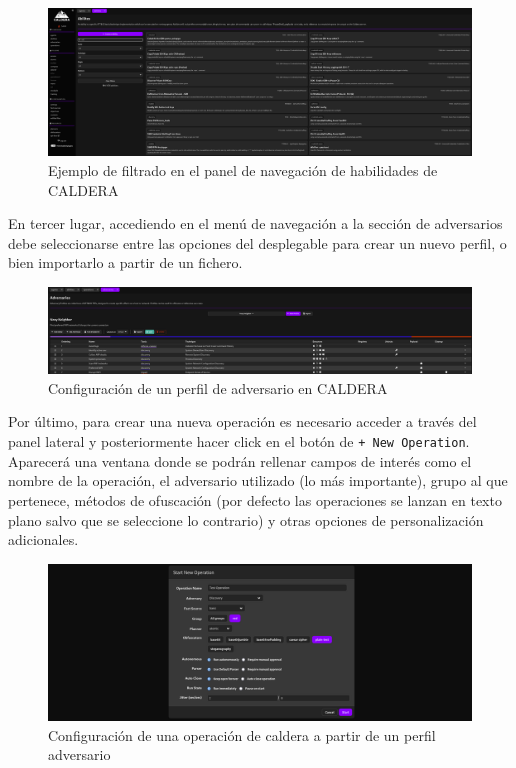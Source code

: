 \begin{figure}[H]
    \centering
    \includegraphics[width=1\linewidth]{imagenes/abilities-caldera.png}
    \caption{Ejemplo de filtrado en el panel de navegación de habilidades de \gls{CALDERA}}
    \label{fig:abilities-caldera}
\end{figure}

En tercer lugar, accediendo en el menú de navegación a la sección de adversarios debe seleccionarse entre las opciones del desplegable para crear un nuevo perfil, o bien importarlo a partir de un fichero.

\begin{figure}[H]
    \centering
    \includegraphics[width=1\linewidth]{imagenes/caldera-adversaries.png}
    \caption{Configuración de un perfil de adversario en \gls{CALDERA}}
    \label{fig:enter-label}
\end{figure}

Por último, para crear una nueva operación es necesario acceder a través del panel lateral y posteriormente hacer click en el botón de \texttt{+ New Operation}. Aparecerá una ventana donde se podrán rellenar campos de interés como el nombre de la operación, el adversario utilizado (lo más importante), grupo al que pertenece, métodos de ofuscación (por defecto las operaciones se lanzan en texto plano salvo que se seleccione lo contrario) y otras opciones de personalización adicionales.

\begin{figure}[H]
    \centering
    \includegraphics[width=1\linewidth]{imagenes/caldera-operation.png}
    \caption{Configuración de una operación de caldera a partir de un perfil adversario}
    \label{fig:caldera-operation}
\end{figure}

